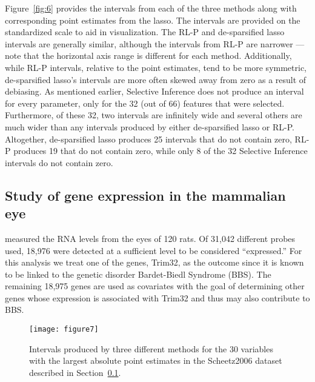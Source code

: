 Figure~\ref{fig:6} provides the intervals from each of the three methods along with corresponding point estimates from the lasso. The intervals are provided on the standardized scale to aid in visualization. The RL-P and de-sparsified lasso intervals are generally similar, although the intervals from RL-P are narrower --- note that the horizontal axis range is different for each method. Additionally, while RL-P intervals, relative to the point estimates, tend to be more symmetric, de-sparsified lasso's intervals are more often skewed away from zero as a result of debiasing. As mentioned earlier, Selective Inference does not produce an interval for every parameter, only for the 32 (out of 66) features that were selected. Furthermore, of these 32, two intervals are infinitely wide and several others are much wider than any intervals produced by either de-sparsified lasso or RL-P. Altogether, de-sparsified lasso produces 25 intervals that do not contain zero, RL-P produces 19 that do not contain zero, while only 8 of the 32 Selective Inference intervals do not contain zero.

\subsection{Study of gene expression in the mammalian eye}\label{Sec:Scheetz2006}

\citet{Scheetz2006} measured the RNA levels from the eyes of 120 rats. Of 31,042 different probes used, 18,976 were detected at a sufficient level to be considered ``expressed.'' For this analysis we treat one of the genes, Trim32, as the outcome since it is known to be linked to the genetic disorder Bardet-Biedl Syndrome (BBS). The remaining 18,975 genes are used as covariates with the goal of determining other genes whose expression is associated with Trim32 and thus may also contribute to BBS.

\begin{figure}[htb!]
  \begin{center}
    \texttt{[image: figure7]}
    \caption{\label{fig:7} Intervals produced by three different methods for the 30 variables with the largest absolute point estimates in the Scheetz2006 dataset described in Section~\ref{Sec:Scheetz2006}.}
  \end{center}
\end{figure}

